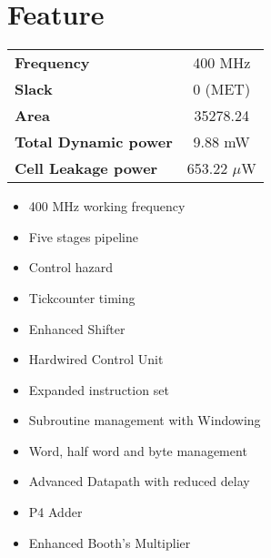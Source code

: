 \chapter{Feature}
\begin{center}
\begin{tabular}{ l c }
	\textbf{Frequency} & 400 MHz \\ 
	\textbf{Slack} & 0 (MET) \\  
	\textbf{Area} & 35278.24 \\  
	\textbf{Total Dynamic power} & 9.88 mW \\  
	\textbf{Cell Leakage power} & 653.22 $\mu$W
\end{tabular}

\end{center}
\hfill

\hfill

\begin{multicols}{2}
\begin{itemize}
\item 400 MHz working frequency
\item Five stages pipeline
\item Control hazard
\item Tickcounter timing
\item Enhanced Shifter
\item Hardwired Control Unit
\end{itemize}

\columnbreak

\begin{itemize}
\item Expanded instruction set
\item Subroutine management with Windowing
\item Word, half word and byte management
\item Advanced Datapath with reduced delay
\item P4 Adder
\item Enhanced Booth's Multiplier
\end{itemize}
\end{multicols}